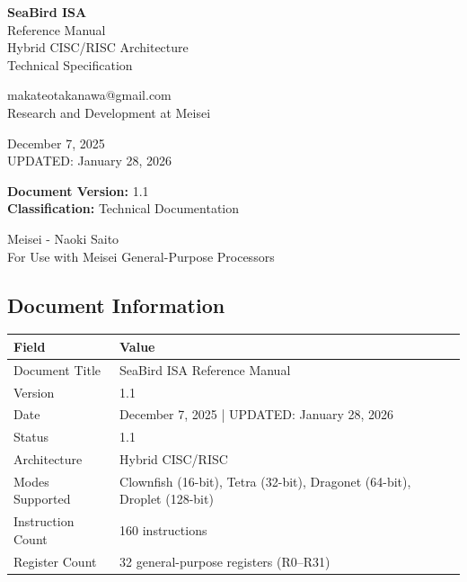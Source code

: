 \documentclass[12pt]{article}
\begin{document}
\begin{titlepage}
    \centering
    \vspace*{2cm}
    
    {\Huge\bfseries SeaBird ISA\\[0.3cm]}
    {\LARGE Reference Manual\\[0.5cm]}
    {\Large Hybrid CISC/RISC Architecture\\[0.3cm]}
    {\large Technical Specification}
    
    \vspace{2cm}
    
    {\large makateotakanawa@gmail.com\\
    Research and Development at Meisei\\[0.5cm]}
    
    \vspace{1cm}
    
    {\large December 7, 2025\\ UPDATED: January 28, 2026\\[1cm]}
    
    \vspace{1cm}
    
    \begin{center}
    \textbf{Document Version:} 1.1\\
    \textbf{Classification:} Technical Documentation
    \end{center}
    
    \vfill
    
    {\small Meisei - Naoki Saito\\
    For Use with Meisei General-Purpose Processors}
    
\end{titlepage}

\newpage

\begin{center}
\section*{Document Information}
\end{center}

\begin{table}[h]
\centering
\begin{tabular}{ll}
\toprule
\textbf{Field} & \textbf{Value} \\
\midrule
Document Title & SeaBird ISA Reference Manual \\
Version & 1.1 \\
Date & December 7, 2025 | UPDATED: January 28, 2026\\
Status & 1.1 \\
Architecture & Hybrid CISC/RISC \\
Modes Supported & Clownfish (16-bit), Tetra (32-bit), Dragonet (64-bit), Droplet (128-bit)\\
Instruction Count & 160 instructions \\
Register Count & 32 general-purpose registers (R0--R31) \\
\bottomrule
\end{tabular}
\end{table}
\end{document}
